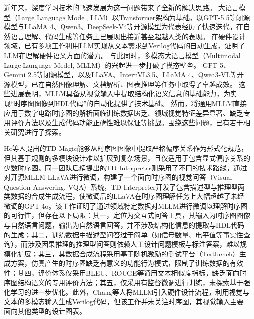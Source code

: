 近年来，深度学习技术的飞速发展为这一问题带来了全新的解决思路。
大语言模型（Large Language Model, LLM）以Transformer架构为基础，以GPT-5.5等闭源模型与LLaMA 4、Qwen3、DeepSeek-V4等开源模型为代表经历了快速迭代，在自然语言理解、代码生成等任务上已展现出接近甚至超越人类的表现。
在硬件设计领域，已有多项工作利用LLM实现从文本需求到Verilog代码的自动生成，证明了LLM在理解硬件语义方面的潜力。
与此同时，多模态大语言模型（Multimodal Large Language Model, MLLM）的兴起进一步打破了模态壁垒。
GPT-5、Gemini 2.5等闭源模型，以及LLaVA、InternVL3.5、LLaMA 4、Qwen3-VL等开源模型，已在自然图像理解、文档解析、图表推理等任务中取得了卓越成效。
这些进展表明，MLLM具备从视觉输入中提取结构化语义信息的基础能力，为实现“时序图图像到HDL代码”的自动化提供了技术基础。
然而，将通用MLLM直接应用于数字电路时序图的解析面临训练数据匮乏、领域视觉特征差异显著、缺乏专用评价方法以及生成代码功能正确性难以保证等挑战。围绕这些问题，已有若干相关研究进行了探索。

He等人提出的TD-Magic能够从时序图图像中提取严格偏序关系作为形式化规范，但其基于规则的多模块设计难以扩展到复杂场景，且仅适用于包含显式偏序关系的少数时序图。同一团队后续提出的TD-Interpreter则采用了不同的技术路线，通过对开源MLLM LLaVA进行微调，构建了一个面向时序图的视觉问答（Visual Question Answering, VQA）系统。TD-Interpreter开发了包含描述型与推理型两类数据的合成生成流程，使微调后的LLaVA在时序图理解任务上大幅超越了未经微调的GPT-4o。该工作证明了通过领域特定数据对MLLM进行微调以理解时序图的可行性，但存在以下局限：其一，定位为交互式问答工具，其输入为时序图图像与自然语言问题，输出为自然语言回答，并不涉及结构化信息的提取与HDL代码的生成；其二，训练数据中描述型问答过于简单（如信号数量、电平值等事实性查询），而涉及因果推理的推理型问答则依赖人工设计问题模板与标注答案，难以规模化扩展；其三，其数据合成流程采用基于随机激励的测试平台（Testbench）生成方案，仿真产生的时序图缺乏有意义的功能行为模式，限制了训练数据的有效性；其四，评价体系仅采用BLEU、ROUGE等通用文本相似度指标，缺乏面向时序图结构语义的专用评价方法；其五，仅采用有监督微调进行训练，未探索基于强化学习的进一步优化。此外，Chang等人将MLLM引入硬件设计流程，利用视觉与文本的多模态输入生成Verilog代码，但该工作并未关注时序图，其视觉输入主要面向其他类型的设计图表。

